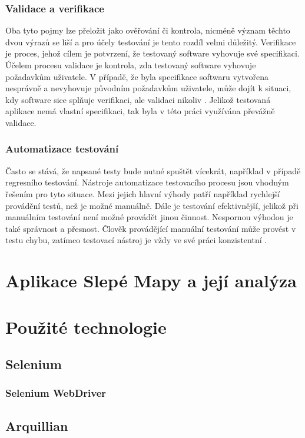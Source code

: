 \documentclass[
    color,   %
	table,   %
    twoside, %
]{fithesis3}
\begin{document}
  \subsection{Validace a verifikace}
  Oba tyto pojmy lze přeložit jako ověřování či kontrola, nicméně význam těchto dvou výrazů se liší a pro účely testování je tento rozdíl velmi důležitý. Verifikace je proces, jehož cílem je potvrzení, že testovaný software vyhovuje své specifikaci. Účelem procesu validace je kontrola, zda testovaný software vyhovuje požadavkům uživatele. V případě, že byla specifikace softwaru vytvořena nesprávně a nevyhovuje původním požadavkům uživatele, může dojít k situaci, kdy software sice splňuje verifikaci, ale validaci nikoliv \cite{Patton}. Jelikož testovaná aplikace nemá vlastní specifikaci, tak byla v této práci využívána převážně validace.
  
  \subsection{Automatizace testování}
  Často se stává, že napsané testy bude nutné spuštět vícekrát, například v případě regresního testování. Nástroje automatizace testovacího procesu jsou vhodným řešením pro tyto situace. Mezi jejich hlavní výhody patří například rychlejší provádění testů, než je možné manuálně. Dále je testování efektivnější, jelikož při manuálním testování není možné provádět jinou činnost. Nespornou výhodou je také správnost a přesnost. Člověk provádějící manuální testování může provést v testu chybu, zatímco testovací nástroj je vždy ve své práci konzistentní \cite{Patton}.
  
  \chapter{Aplikace Slepé Mapy a její analýza}
 
  \chapter{Použité technologie}

  \section{Selenium}
  \subsection{Selenium WebDriver}
  \section{Arquillian}
\end{document}
